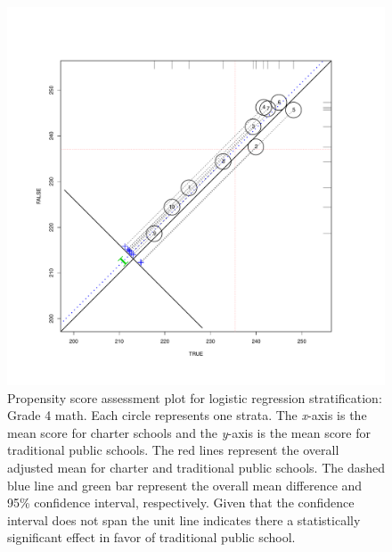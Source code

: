 \documentclass[letterpaper,12p,twoside]{article} %
\begin{document}
\setlength{\belowcaptionskip}{-10pt}
\begin{figure}[t!]
\begin{center}
\includegraphics[width=\textwidth,trim=0 .7in 0 .7in]{../Figures2009/g4math-circpsa10.pdf}
\caption[Propensity score assessment plot for logistic regression stratification: Grade 4 math]{Propensity score assessment plot for logistic regression stratification: Grade 4 math. Each circle represents one strata. The \textit{x}-axis is the mean score for charter schools and the \textit{y}-axis is the mean score for traditional public schools. The red lines represent the overall adjusted mean for charter and traditional public schools. The dashed blue line and green bar represent the overall mean difference and 95\% confidence interval, respectively. Given that the confidence interval does not span the unit line indicates there a statistically significant effect in favor of traditional public school.}
\label{fig:g4math:circpsa}
\end{center}
\end{figure}
\setlength{\belowcaptionskip}{0pt}
\end{document}
